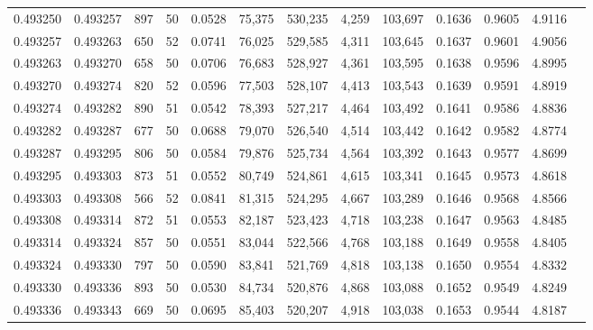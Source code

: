 \begin{tabular}{rrrrrrrrrrrrr}
0.493250 & 0.493257 &   897 &  50 &                                     0.0528 &  75,375 & 530,235 &   4,259 & 103,697 & 0.1636 & 0.9605 & 4.9116 \\
0.493257 & 0.493263 &   650 &  52 &                                     0.0741 &  76,025 & 529,585 &   4,311 & 103,645 & 0.1637 & 0.9601 & 4.9056 \\
0.493263 & 0.493270 &   658 &  50 &                                     0.0706 &  76,683 & 528,927 &   4,361 & 103,595 & 0.1638 & 0.9596 & 4.8995 \\
0.493270 & 0.493274 &   820 &  52 &                                     0.0596 &  77,503 & 528,107 &   4,413 & 103,543 & 0.1639 & 0.9591 & 4.8919 \\
0.493274 & 0.493282 &   890 &  51 &                                     0.0542 &  78,393 & 527,217 &   4,464 & 103,492 & 0.1641 & 0.9586 & 4.8836 \\
0.493282 & 0.493287 &   677 &  50 &                                     0.0688 &  79,070 & 526,540 &   4,514 & 103,442 & 0.1642 & 0.9582 & 4.8774 \\
0.493287 & 0.493295 &   806 &  50 &                                     0.0584 &  79,876 & 525,734 &   4,564 & 103,392 & 0.1643 & 0.9577 & 4.8699 \\
0.493295 & 0.493303 &   873 &  51 &                                     0.0552 &  80,749 & 524,861 &   4,615 & 103,341 & 0.1645 & 0.9573 & 4.8618 \\
0.493303 & 0.493308 &   566 &  52 &                                     0.0841 &  81,315 & 524,295 &   4,667 & 103,289 & 0.1646 & 0.9568 & 4.8566 \\
0.493308 & 0.493314 &   872 &  51 &                                     0.0553 &  82,187 & 523,423 &   4,718 & 103,238 & 0.1647 & 0.9563 & 4.8485 \\
0.493314 & 0.493324 &   857 &  50 &                                     0.0551 &  83,044 & 522,566 &   4,768 & 103,188 & 0.1649 & 0.9558 & 4.8405 \\
0.493324 & 0.493330 &   797 &  50 &                                     0.0590 &  83,841 & 521,769 &   4,818 & 103,138 & 0.1650 & 0.9554 & 4.8332 \\
0.493330 & 0.493336 &   893 &  50 &                                     0.0530 &  84,734 & 520,876 &   4,868 & 103,088 & 0.1652 & 0.9549 & 4.8249 \\
0.493336 & 0.493343 &   669 &  50 &                                     0.0695 &  85,403 & 520,207 &   4,918 & 103,038 & 0.1653 & 0.9544 & 4.8187 \\

\end{tabular}
